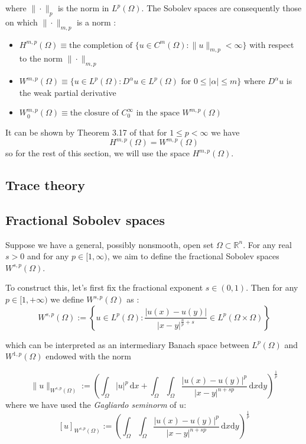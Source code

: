 where $\|\cdot\|_p$ is the norm in $L^p(\Omega)$. The Sobolev spaces are consequently those on which $\|\cdot \|_{m, p}$ is a norm \cite{adams2003sobolev}:
\begin{itemize}
    \item $H^{m, p}(\Omega) \equiv \text{the completion of } \{u \in C^m (\Omega) : \|u\|_{m, p} < \infty\}$ with respect to the norm $\|\cdot \|_{m, p}$
    \item $W^{m, p}(\Omega) \equiv \{u \in L^p(\Omega) : D^\alpha u \in L^p(\Omega) \text{ for } 0 \le |\alpha| \le m \}$ where $D^\alpha u$ is the weak partial derivative
    \item $W_0^{m, p}(\Omega) \equiv \text{the closure of }C^\infty_0 \text{ in the space } W^{m, p}(\Omega)$
\end{itemize}

It can be shown by Theorem 3.17 of \cite{adams2003sobolev} that for $1 \le p < \infty$ we have
$$H^{m, p}(\Omega) = W^{m, p}(\Omega)$$
so for the rest of this section, we will use the space $H^{m, p}(\Omega)$. 

\subsection{Trace theory}




\subsection{Fractional Sobolev spaces}
Suppose we have a general, possibly nonsmooth, open set $\Omega \subset \mathbb R^n$. For any real $s > 0$ and for any $p \in [1, \infty)$, we aim to define the fractional Sobolev spaces $W^{s, p}(\Omega)$.

To construct this, let's first fix the fractional exponent $s \in (0, 1)$. Then for any $p \in [1, +\infty)$ we define $W^{s, p}(\Omega)$ as \cite{di2012hitchhikers}:
$$W^{s, p}(\Omega) := \left\{u \in L^p(\Omega) : \frac{|u(x) - u(y)|}{|x-y|^{\frac np + s}} \in L^p(\Omega \times \Omega)\right\}$$

which can be interpreted as an intermediary Banach space between $L^p(\Omega)$ and $W^{1, p}(\Omega)$ endowed with the norm

$$\|u\|_{W^{s, p}(\Omega)} := \left(\int_\Omega |u|^p \,\mathrm dx + \int_\Omega \int_\Omega \frac{|u(x)-u(y)|^p}{|x-y|^{n+sp}}\,\mathrm dx \mathrm dy\right)^{\frac 1p}$$
where we have used the \textit{Gagliardo seminorm} of $u$:
$$[u]_{W^{s, p}(\Omega)} := \left( \int_\Omega \int_\Omega \frac{|u(x)-u(y)|^p}{|x-y|^{n+sp}}\,\mathrm dx \mathrm dy\right)^{\frac 1p}$$


